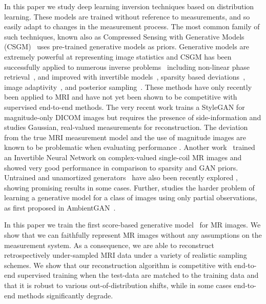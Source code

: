 \documentclass{article}
\begin{document}
In this paper we study deep learning inversion techniques based on
distribution learning.  These models are trained without reference to
measurements, and so easily adapt to changes in the measurement
process.  The most common family of such techniques, known also as
Compressed Sensing with Generative Models
(CSGM)~\cite{bora2017compressed} uses pre-trained generative models as
priors.  Generative models are extremely powerful at representing
image statistics and CSGM has been successfully applied to numerous
inverse problems~\cite{bora2017compressed,hand2019global} including
non-linear phase retrieval~\cite{hand2018phase}, and improved with
invertible models~\cite{asim2019invertible}, sparsity based
deviations~\cite{dhar2018modeling}, image
adaptivity~\cite{hussein2020image}, and posterior
sampling~\cite{song2019generative, jalal2021instance}.  These methods
have only recently been applied to MRI and have not yet been shown to
be competitive with supervised end-to-end methods.  The very recent
work \cite{kelkar2021prior} trains a StyleGAN for magnitude-only DICOM
images but requires the presence of side-information and studies
Gaussian, real-valued measurements for reconstruction.  The deviation
from the true MRI measurement model and the use of magnitude images
are known to be problematic when evaluating performance
\cite{shimron2021subtle}.  Another work~\cite{kelkar2021compressible}
trained an Invertible Neural Network on complex-valued single-coil MR
images and showed very good performance in comparison to sparsity and
GAN priors.  Untrained and unamortized
generators~\cite{heckel2018deep} have also been recently explored
\cite{darestani2021measuring}, showing promising results in some
cases. Further, \cite{cole2021fast} studies the harder problem of
learning a generative model for a class of images using only partial
observations, as first proposed in
AmbientGAN~\cite{bora2018ambientgan}.


In this paper we train the first score-based generative
model~\cite{song2020improved} for MR images. We show that we can
faithfully represent MR images without any assumptions on the
measurement system. As a consequence, we are able to reconstruct
retrospectively under-sampled MRI data under a variety of realistic
sampling schemes. We show that our reconstruction algorithm is
competitive with end-to-end supervised training when the test-data are
matched to the training data and that it is robust to various
out-of-distribution shifts, while in some cases end-to-end methods
significantly degrade. 
\end{document}
